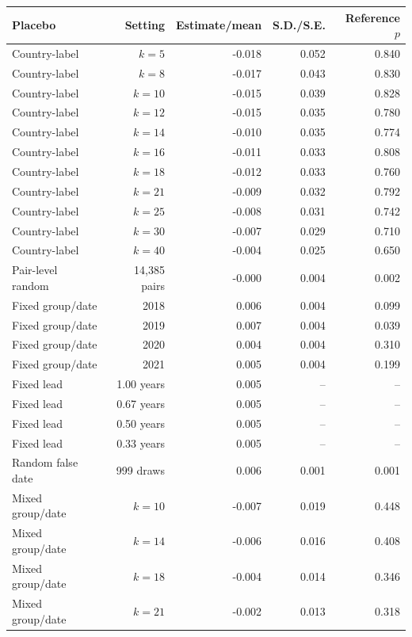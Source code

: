 \begin{tabular}{lrrrr}
\toprule
Placebo & Setting & Estimate/mean & S.D./S.E. & Reference $p$ \\
\midrule
Country-label & $k=5$ & -0.018 & 0.052 & 0.840 \\
Country-label & $k=8$ & -0.017 & 0.043 & 0.830 \\
Country-label & $k=10$ & -0.015 & 0.039 & 0.828 \\
Country-label & $k=12$ & -0.015 & 0.035 & 0.780 \\
Country-label & $k=14$ & -0.010 & 0.035 & 0.774 \\
Country-label & $k=16$ & -0.011 & 0.033 & 0.808 \\
Country-label & $k=18$ & -0.012 & 0.033 & 0.760 \\
Country-label & $k=21$ & -0.009 & 0.032 & 0.792 \\
Country-label & $k=25$ & -0.008 & 0.031 & 0.742 \\
Country-label & $k=30$ & -0.007 & 0.029 & 0.710 \\
Country-label & $k=40$ & -0.004 & 0.025 & 0.650 \\
Pair-level random & 14,385 pairs & -0.000 & 0.004 & 0.002 \\
Fixed group/date & 2018 & 0.006 & 0.004 & 0.099 \\
Fixed group/date & 2019 & 0.007 & 0.004 & 0.039 \\
Fixed group/date & 2020 & 0.004 & 0.004 & 0.310 \\
Fixed group/date & 2021 & 0.005 & 0.004 & 0.199 \\
Fixed lead & 1.00 years & 0.005 & -- & -- \\
Fixed lead & 0.67 years & 0.005 & -- & -- \\
Fixed lead & 0.50 years & 0.005 & -- & -- \\
Fixed lead & 0.33 years & 0.005 & -- & -- \\
Random false date & 999 draws & 0.006 & 0.001 & 0.001 \\
Mixed group/date & $k=10$ & -0.007 & 0.019 & 0.448 \\
Mixed group/date & $k=14$ & -0.006 & 0.016 & 0.408 \\
Mixed group/date & $k=18$ & -0.004 & 0.014 & 0.346 \\
Mixed group/date & $k=21$ & -0.002 & 0.013 & 0.318 \\
\bottomrule
\end{tabular}